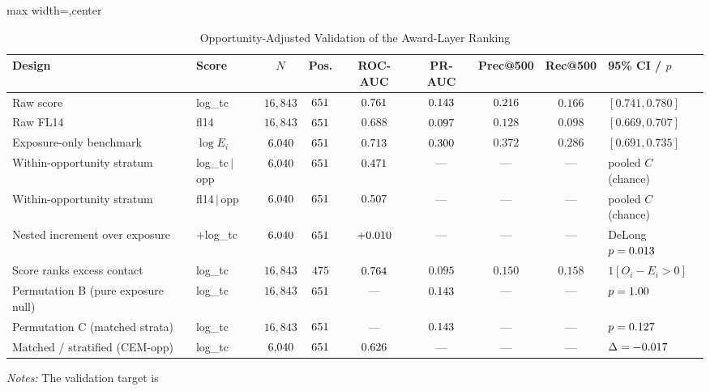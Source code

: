 \begin{table}[htbp]
\centering
\caption{Opportunity-Adjusted Validation of the Award-Layer Ranking}
\label{tab:opportunity_adjusted_validation}
\scriptsize
\begin{adjustbox}{max width=\textwidth,center}
\begin{threeparttable}
\begin{tabular}{p{3.6cm}lccccccl}
\toprule
Design & Score & $N$ & Pos. & ROC-AUC & PR-AUC & Prec@500 & Rec@500 & 95\% CI / $p$ \\
\midrule
Raw score & log\_tc & $16{,}843$ & $651$ & $0.761$ & $0.143$ & $0.216$ & $0.166$ & $[0.741,0.780]$ \\
Raw FL14 & fl14 & $16{,}843$ & $651$ & $0.688$ & $0.097$ & $0.128$ & $0.098$ & $[0.669,0.707]$ \\
Exposure-only benchmark & $\log E_i$ & $6{,}040$ & $651$ & $0.713$ & $0.300$ & $0.372$ & $0.286$ & $[0.691,0.735]$ \\
Within-opportunity stratum & log\_tc$\,|\,$opp & $6{,}040$ & $651$ & $0.471$ & --- & --- & --- & pooled $C$ (chance) \\
Within-opportunity stratum & fl14$\,|\,$opp & $6{,}040$ & $651$ & $0.507$ & --- & --- & --- & pooled $C$ (chance) \\
Nested increment over exposure & $+$log\_tc & $6{,}040$ & $651$ & $+0.010$ & --- & --- & --- & DeLong $p=0.013$ \\
Score ranks excess contact & log\_tc & $16{,}843$ & $475$ & $0.764$ & $0.095$ & $0.150$ & $0.158$ & $1[O_i{-}E_i{>}0]$ \\
Permutation B (pure exposure null) & log\_tc & $16{,}843$ & $651$ & --- & $0.143$ & --- & --- & $p=1.00$ \\
Permutation C (matched strata) & log\_tc & $16{,}843$ & $651$ & --- & $0.143$ & --- & --- & $p=0.127$ \\
Matched / stratified (CEM-opp) & log\_tc & $6{,}040$ & $651$ & $0.626$ & --- & --- & --- & $\Delta=-0.017$ \\
\bottomrule
\end{tabular}
\begin{tablenotes}
\scriptsize
\item \textit{Notes:} The validation target is

\end{tablenotes}
\end{threeparttable}
\end{adjustbox}
\end{table}
